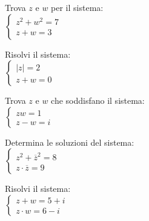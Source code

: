 \documentclass[letterpaper,10pt,italian]{jupyterBook}
\begin{document}
\sphinxAtStartPar
{} Trova \(z\) e \(w\) per il sistema:\\
\(\begin{cases} 
   z^2 + w^2 = 7 \\
   z + w = 3 
   \end{cases}\)

\sphinxAtStartPar
{} Risolvi il sistema:\\
\(\begin{cases} 
   |z| = 2 \\
   z + w = 0 
   \end{cases}\)

\sphinxAtStartPar
{} Trova \(z\) e \(w\) che soddisfano il sistema:\\
\(\begin{cases} 
   z w = 1 \\
   z - w = i 
   \end{cases}\)

\sphinxAtStartPar
{} Determina le soluzioni del sistema:\\
\(\begin{cases} 
   z^2 + \overline{z}^2 = 8 \\
   z \cdot \overline{z} = 9 
   \end{cases}\)

\sphinxAtStartPar
{} Risolvi il sistema:\\
\(\begin{cases} 
    z + w = 5 + i \\
    z \cdot w = 6 - i 
    \end{cases}\)

\sphinxstepscope
\end{document}
